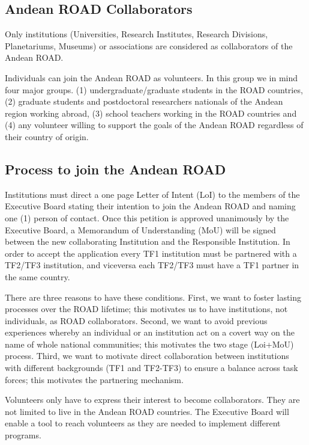 \documentclass[12pt]{article}
\begin{document}
\subsection*{Andean ROAD Collaborators}


Only institutions (Universities, Research Institutes, Research
Divisions, Planetariums, Museums) or associations are considered
as collaborators of the Andean ROAD. 


Individuals can join the Andean ROAD as volunteers. In this group we
in mind four major groups. (1) undergraduate/graduate students in the
ROAD countries, (2) graduate students and postdoctoral researchers
nationals of the Andean region working abroad, (3) school teachers
working in the ROAD countries and (4) any volunteer willing to support
the goals of the Andean ROAD regardless of their country of origin. 


\subsection*{Process to join the Andean ROAD}

Institutions must direct a one page Letter of Intent (LoI) to the
members of the Executive Board stating their intention to join the
Andean ROAD and naming one (1) person of contact. Once this petition
is approved unanimously by the Executive Board, a Memorandum of
Understanding (MoU) will be signed between the new collaborating Institution
and the Responsible Institution. In order to accept the application
every TF1 institution must be partnered with a TF2/TF3 institution,
and viceversa each TF2/TF3 must have a TF1 partner in the same
country. 

There are three reasons to have these conditions. First, we want to
foster lasting processes over the ROAD lifetime; this motivates us to
have institutions, not individuals, as ROAD collaborators. Second, we want
to avoid previous experiences whereby an individual or an institution
act on a covert way on the name of whole national communities; this
motivates the two stage (Loi+MoU) process. Third, we want to motivate
direct collaboration between institutions with different backgrounds
(TF1 and TF2-TF3) to ensure a balance across task forces; this
motivates the partnering mechanism.  

Volunteers only have to express their interest to become
collaborators. They are not limited to live in the Andean ROAD
countries. The Executive Board will enable a tool to reach volunteers
as they are needed to implement different programs.  
\end{document}

